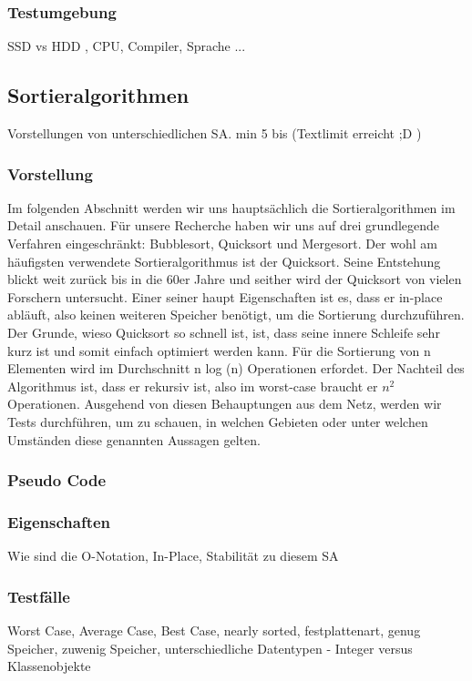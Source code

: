 \documentclass{article}
\begin{document}
\subsubsection{Testumgebung}
SSD vs HDD , CPU, Compiler, Sprache ...


\subsection{Sortieralgorithmen}
Vorstellungen von unterschiedlichen SA. min 5 bis (Textlimit erreicht ;D  ) 
\subsubsection{Vorstellung}
Im folgenden Abschnitt werden wir uns hauptsächlich die Sortieralgorithmen im Detail anschauen. Für unsere Recherche haben wir uns auf drei grundlegende Verfahren eingeschränkt: Bubblesort, Quicksort und Mergesort. Der wohl am häufigsten verwendete Sortieralgorithmus ist der Quicksort. Seine Entstehung blickt weit zurück bis in die 60er Jahre und seither wird der Quicksort von vielen Forschern untersucht. Einer seiner haupt Eigenschaften ist es, dass er in-place abläuft, also keinen weiteren Speicher benötigt, um die Sortierung durchzuführen. Der Grunde, wieso Quicksort so schnell ist, ist, dass seine innere Schleife sehr kurz ist und somit einfach optimiert werden kann. Für die Sortierung von n Elementen wird im Durchschnitt n log (n) Operationen erfordet. Der Nachteil des Algorithmus ist, dass er rekursiv ist, also im worst-case braucht er $n^{2}$  Operationen. Ausgehend von diesen Behauptungen aus dem Netz, werden wir Tests durchführen, um zu schauen, in welchen Gebieten oder unter welchen Umständen diese genannten Aussagen gelten.
\subsubsection{Pseudo Code}
\subsubsection{Eigenschaften}
Wie sind die O-Notation, In-Place, Stabilität zu diesem SA
\subsubsection{Testfälle}
Worst Case, Average Case, Best Case, nearly sorted, festplattenart, genug Speicher, zuwenig Speicher, unterschiedliche Datentypen - Integer versus Klassenobjekte
\end{document}
